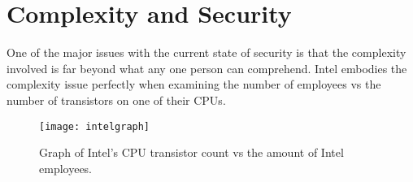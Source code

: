 \section{Complexity and Security}

\label{Ch2 Sec1}

One of the major issues with the current state of security is that the complexity involved is far beyond what any one person can comprehend.
Intel embodies the complexity issue perfectly when examining the number of employees vs the number of transistors on one of their CPUs.\\

\begin{figure}
  \centering
  \texttt{[image: intelgraph]}
  \caption{Graph of Intel's CPU transistor count vs the amount of Intel employees.\\ \cite{Reference28}\cite{Reference29}\cite{Reference30}\cite{Reference31}\cite{Reference32}\cite{Reference33}\cite{Reference34}\cite{Reference35}
}
  \label{fig:intelgraph}
\end{figure}

